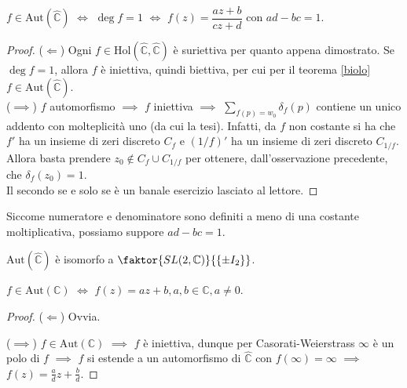 \begin{cor}
  $f \in \text{Aut}(\hat{\mathbb{C}})$ $\iff$ $\deg{f}=1$ $\iff$ $f(z)=\dfrac{az+b}{cz+d}$ con $ad-bc=1$.
\end{cor}

\begin{proof}
  ($\Leftarrow$) Ogni $f \in \text{Hol}(\hat{\mathbb{C}}, \hat{\mathbb{C}})$ è suriettiva per quanto appena dimostrato. Se $\deg{f}=1$, allora $f$ è iniettiva, quindi biettiva, per cui per il teorema \ref{biolo} $f \in \text{Aut}(\hat{\mathbb{C}})$. \\
  ($\implies$) $f$ automorfismo $\implies$ $f$ iniettiva $\implies$ $\displaystyle \sum_{f(p)=w_0} \delta_f(p)$ contiene un unico addento con molteplicità uno (da cui la tesi). Infatti, da $f$ non costante si ha che $f'$ ha un insieme di zeri discreto $C_f$ e $(1/f)'$ ha un insieme di zeri discreto $C_{1/f}$. Allora basta prendere $z_0 \not\in C_f \cup C_{1/f}$ per ottenere, dall'osservazione precedente, che $\delta_f(z_0)=1$. \\
  Il secondo se e solo se è un banale esercizio lasciato al lettore.
\end{proof}

\begin{oss}
  Siccome numeratore e denominatore sono definiti a meno di una costante moltiplicativa, possiamo suppore $ad-bc=1$.
\end{oss}

\begin{exc}
  $\text{Aut}(\hat{\mathbb{C}})$ è isomorfo a $\faktor{SL(2, \mathbb{C})}{\{\pm I_2\}}$.
\end{exc}

\begin{cor}
  $f \in \text{Aut}(\mathbb{C})$ $\iff$ $f(z)=az+b, a, b \in \mathbb{C}, a\not=0$.
\end{cor}

\begin{proof}
  ($\Leftarrow$) Ovvia.

  ($\implies$) $f \in \text{Aut}(\mathbb{C})$ $\implies$ $f$ è iniettiva, dunque per Casorati-Weierstrass $\infty$ è un polo di $f$ $\implies$ $f$ si estende a un automorfismo di $\hat{\mathbb{C}}$ con $f(\infty)=\infty$ $\implies$ $f(z)=\frac{a}{d}z+\frac{b}{d}$.
\end{proof}
